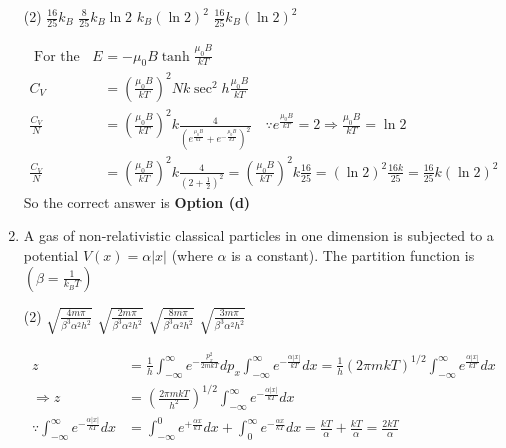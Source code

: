 \begin{enumerate}
{	}
 \begin{tasks}(2)
	\task[\textbf{a.}]$\frac{16}{25} k_{B}$
	\task[\textbf{b.}] $\frac{8}{25} k_{B} \ln 2$
	\task[\textbf{c.}]$k_{B}(\ln 2)^{2}$
	\task[\textbf{d.}]  $\frac{16}{25} k_{B}(\ln 2)^{2}$
\end{tasks}
\begin{answer}
	\begin{align*}
	\text {  For the given system } E&=-\mu_{0} B \tanh \frac{\mu_{0} B}{k T}\\
	C_{V}&=\left(\frac{\mu_{0} B}{k T}\right)^{2} N k \sec ^{2} h \frac{\mu_{0} B}{k T}\\
	\frac{C_{V}}{N}&=\left(\frac{\mu_{0} B}{k T}\right)^{2} k \frac{4}{\left(e^{\frac{\mu_{0} B}{k T}}+e^{-\frac{\mu_{0} B}{k T}}\right)^{2}} \quad \because e^{\frac{\mu_{0} B}{k T}}=2 \Rightarrow \frac{\mu_{0} B}{k T}=\ln 2\\
	\frac{C_{V}}{N}&=\left(\frac{\mu_{0} B}{k T}\right)^{2} k \frac{4}{\left(2+\frac{1}{2}\right)^{2}}=\left(\frac{\mu_{0} B}{k T}\right)^{2} k \frac{16}{25}=(\ln 2)^{2} \frac{16 k}{25}=\frac{16}{25} k(\ln 2)^{2}
	\end{align*}
	So the correct answer is \textbf{Option (d)}
\end{answer}
\item A gas of non-relativistic classical particles in one dimension is subjected to a potential $V(x)=\alpha|x|$ (where $\alpha$ is a constant). The partition function is $\left(\beta=\frac{1}{k_{B} T}\right)$
{	}
 \begin{tasks}(2)
	\task[\textbf{a.}] $\sqrt{\frac{4 m \pi}{\beta^{3} \alpha^{2} h^{2}}}$
	\task[\textbf{b.}] $\sqrt{\frac{2 m \pi}{\beta^{3} \alpha^{2} h^{2}}}$
	\task[\textbf{c.}]$\sqrt{\frac{8 m \pi}{\beta^{3} \alpha^{2} h^{2}}}$
	\task[\textbf{d.}] $\sqrt{\frac{3 m \pi}{\beta^{3} \alpha^{2} h^{2}}}$
\end{tasks}
\begin{answer}
	\begin{align*}
	z&=\frac{1}{h} \int_{-\infty}^{\infty} e^{-\frac{p_{x}^{2}}{2 m k T}} d p_{x} \int_{-\infty}^{\infty} e^{-\frac{\alpha|x|}{k T}} d x=\frac{1}{h}(2 \pi m k T)^{1 / 2} \int_{-\infty}^{\infty} e^{\frac{\alpha|x|}{k T}} d x\\
	\Rightarrow z&=\left(\frac{2 \pi m k T}{h^{2}}\right)^{1 / 2} \int_{-\infty}^{\infty} e^{-\frac{\alpha|x|}{k T}} d x\\
	\because \int_{-\infty}^{\infty} e^{-\frac{\alpha|x|}{k T}} d x&=\int_{-\infty}^{0} e^{+\frac{\alpha x}{k T}} d x+\int_{0}^{\infty} e^{-\frac{\alpha x}{k T}} d x=\frac{k T}{\alpha}+\frac{k T}{\alpha}=\frac{2 k T}{\alpha}\\

\end{align*}
\end{answer}
\end{enumerate}
